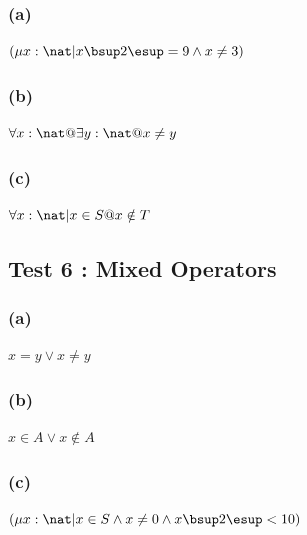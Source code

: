\documentclass[a4paper,10pt,fleqn]{article}
\begin{document}
\subsubsection*{(a)}

\noindent
$(\mu x : \nat | x \bsup 2 \esup = 9 \land x \neq 3)$


\medskip

\subsubsection*{(b)}

\noindent
$\forall x : \nat @ \exists y : \nat @ x \neq y$


\medskip

\subsubsection*{(c)}

\noindent
$\forall x : \nat | x \in S @ x \notin T$


\subsection*{Test 6 : Mixed Operators}

\subsubsection*{(a)}

\noindent
$x = y \lor x \neq y$


\medskip

\subsubsection*{(b)}

\noindent
$x \in A \lor x \notin A$


\medskip

\subsubsection*{(c)}

\noindent
$(\mu x : \nat | x \in S \land x \neq 0 \land x \bsup 2 \esup < 10)$
\end{document}
